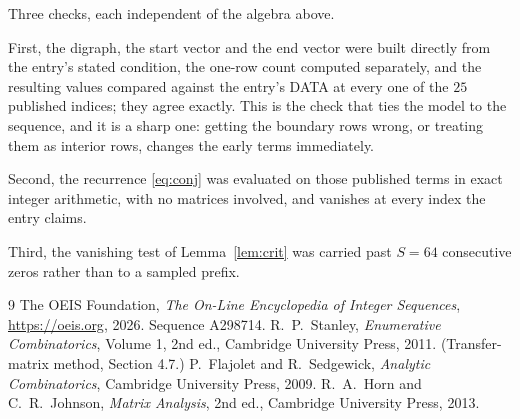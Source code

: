 \documentclass[11pt,a4paper]{article}
\theoremstyle{plain}
\theoremstyle{definition}
\begin{document}
Three checks, each independent of the algebra above.

First, the digraph, the start vector and the end vector were built directly from the
entry's stated condition, the one-row count computed separately, and the resulting values
compared against the entry's DATA at every one of the $25$ published indices; they
agree exactly. This is the check that ties the model to the sequence, and it is a sharp one:
getting the boundary rows wrong, or treating them as interior rows, changes the early terms
immediately.

Second, the recurrence \eqref{eq:conj} was evaluated on those published terms in exact
integer arithmetic, with no matrices involved, and vanishes at every index the entry claims.

Third, the vanishing test of Lemma~\ref{lem:crit} was carried past $S=64$ consecutive
zeros rather than to a sampled prefix.

\begin{thebibliography}{9}
 The OEIS Foundation, \emph{The On-Line Encyclopedia of Integer
Sequences}, \url{https://oeis.org}, 2026. Sequence A298714.
 R.~P.~Stanley, \emph{Enumerative Combinatorics}, Volume 1, 2nd ed.,
Cambridge University Press, 2011. (Transfer-matrix method, Section 4.7.)
 P.~Flajolet and R.~Sedgewick, \emph{Analytic Combinatorics}, Cambridge
University Press, 2009.
 R.~A.~Horn and C.~R.~Johnson, \emph{Matrix Analysis}, 2nd ed., Cambridge
University Press, 2013.
\end{thebibliography}
\end{document}

